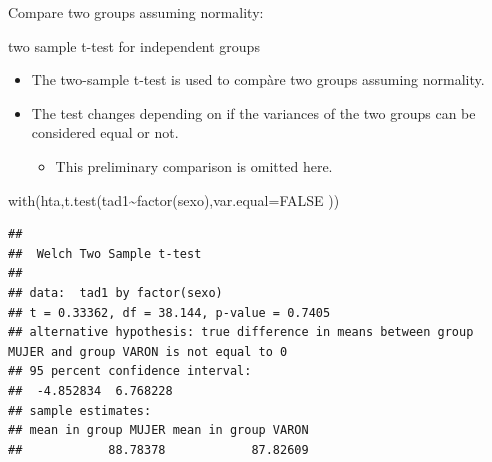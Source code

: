 \documentclass[
  ignorenonframetext,
]{beamer}
\newenvironment{Shaded}{\begin{snugshade}}{\end{snugshade}}
\newcommand{\AttributeTok}[1]{\textcolor[rgb]{0.77,0.63,0.00}{#1}}
\newcommand{\ConstantTok}[1]{\textcolor[rgb]{0.00,0.00,0.00}{#1}}
\newcommand{\FunctionTok}[1]{\textcolor[rgb]{0.00,0.00,0.00}{#1}}
\newcommand{\NormalTok}[1]{#1}
\newcommand{\SpecialCharTok}[1]{\textcolor[rgb]{0.00,0.00,0.00}{#1}}
\providecommand{\tightlist}{%
  \setlength{\itemsep}{0pt}\setlength{\parskip}{0pt}}
\begin{document}
\begin{frame}[fragile]{Compare two groups assuming normality:}
\protect\hypertarget{compare-two-groups-assuming-normality}{}
\begin{block}{two sample t-test for independent groups}
\protect\hypertarget{two-sample-t-test-for-independent-groups}{}
\begin{itemize}
\item
  The two-sample t-test is used to compàre two groups assuming
  normality.
\item
  The test changes depending on if the variances of the two groups can
  be considered equal or not.

  \begin{itemize}
  \tightlist
  \item
    This preliminary comparison is omitted here.
  \end{itemize}
\end{itemize}

\tiny

\begin{Shaded}
\begin{Highlighting}[]
\FunctionTok{with}\NormalTok{(hta,}\FunctionTok{t.test}\NormalTok{(tad1}\SpecialCharTok{\textasciitilde{}}\FunctionTok{factor}\NormalTok{(sexo),}\AttributeTok{var.equal=}\ConstantTok{FALSE}\NormalTok{ ))}
\end{Highlighting}
\end{Shaded}

\begin{verbatim}
## 
##  Welch Two Sample t-test
## 
## data:  tad1 by factor(sexo)
## t = 0.33362, df = 38.144, p-value = 0.7405
## alternative hypothesis: true difference in means between group MUJER and group VARON is not equal to 0
## 95 percent confidence interval:
##  -4.852834  6.768228
## sample estimates:
## mean in group MUJER mean in group VARON 
##            88.78378            87.82609
\end{verbatim}
\end{block}
\end{frame}
\end{document}
